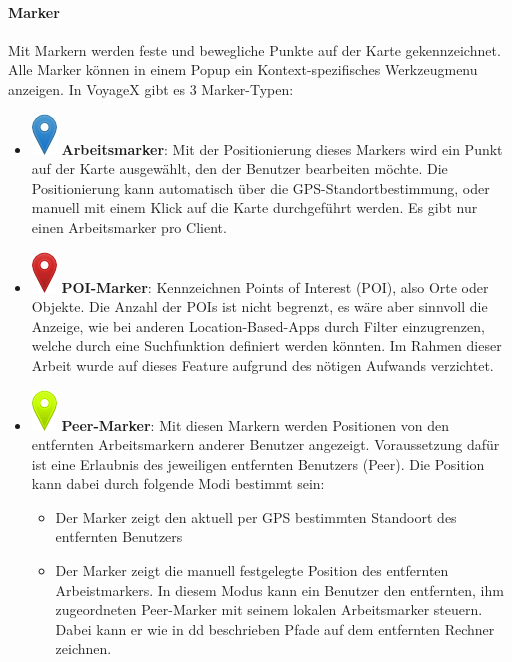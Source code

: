 \paragraph{Marker}
Mit Markern werden feste und bewegliche Punkte auf der Karte gekennzeichnet. Alle Marker können in einem Popup ein Kontext-spezifisches Werkzeugmenu anzeigen. In VoyageX gibt es 3 Marker-Typen:
\begin{itemize}[leftmargin=*,noitemsep,topsep=1ex,parsep=0pt,partopsep=0pt]
\item \includegraphics[scale=0.3]{bilder/marker-icon-blue.png} \textbf{Arbeitsmarker}: Mit der Positionierung dieses Markers wird ein Punkt auf der Karte ausgewählt, den der Benutzer bearbeiten möchte. Die Positionierung kann automatisch über die GPS-Standortbestimmung, oder manuell mit einem Klick auf die Karte durchgeführt werden. Es gibt nur einen Arbeitsmarker pro Client.
\item \includegraphics[scale=0.3]{bilder/marker-icon-red.png} \textbf{POI-Marker}: Kennzeichnen Points of Interest (POI), also Orte oder Objekte. Die Anzahl der POIs ist nicht begrenzt, es wäre aber sinnvoll die Anzeige, wie bei anderen Location-Based-Apps durch Filter einzugrenzen, welche durch eine Suchfunktion definiert werden könnten. Im Rahmen dieser Arbeit wurde auf dieses Feature aufgrund des nötigen Aufwands
verzichtet.
\item \includegraphics[scale=0.3]{bilder/marker-icon-yellow.png} \textbf{Peer-Marker}: Mit diesen Markern werden Positionen von den entfernten Arbeitsmarkern anderer Benutzer angezeigt. Voraussetzung dafür ist eine Erlaubnis des jeweiligen entfernten Benutzers (Peer). Die Position kann dabei durch folgende Modi bestimmt sein:
	\begin{itemize}
		\item Der Marker zeigt den aktuell per GPS bestimmten Standoort des entfernten Benutzers
		\item Der Marker zeigt die manuell festgelegte Position des entfernten Arbeistmarkers. In diesem Modus kann ein Benutzer den entfernten, ihm zugeordneten Peer-Marker mit seinem lokalen Arbeitsmarker steuern. Dabei kann er wie in dd beschrieben Pfade auf dem entfernten Rechner zeichnen.
	\end{itemize}
\end{itemize}

